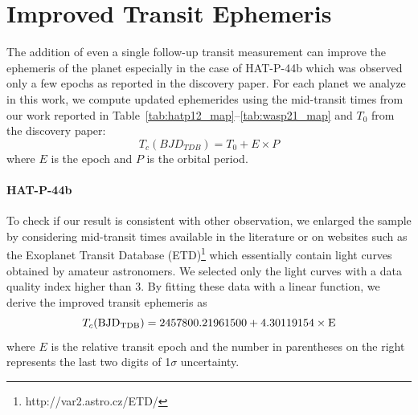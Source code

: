 \section{Improved Transit Ephemeris}

The addition of even a single follow-up transit measurement can improve the ephemeris of the planet especially in the case of HAT-P-44b which was observed only a few epochs as reported in the discovery paper. For each planet we analyze in this work, we compute updated ephemerides using the mid-transit times from our work reported in Table~\ref{tab:hatp12_map}--\ref{tab:wasp21_map} and $T_0$ from the discovery paper: %
\begin{equation}
T_c(BJD_{TDB})=T_0+E \times P
\end{equation}
where $E$ is the epoch and $P$ is the orbital period. 

\paragraph{HAT-P-44b}
To check if our result is consistent with other observation, we enlarged the sample by considering mid-transit times available in the literature or on websites such as the Exoplanet Transit Database (ETD)\footnote{http://var2.astro.cz/ETD/} %
which essentially contain light curves obtained by amateur astronomers. We selected only the light curves with a data quality index higher than 3. %
By fitting these data with a linear function, we derive the improved transit ephemeris as
\begin{equation}
T_c(\rm{BJD_{TDB}})= 2457800.21961500+4.30119154 \times E
\end{equation}
where $E$ is the relative transit epoch and the number in parentheses on the right represents the last two digits of 1$\sigma$ uncertainty. %
 
